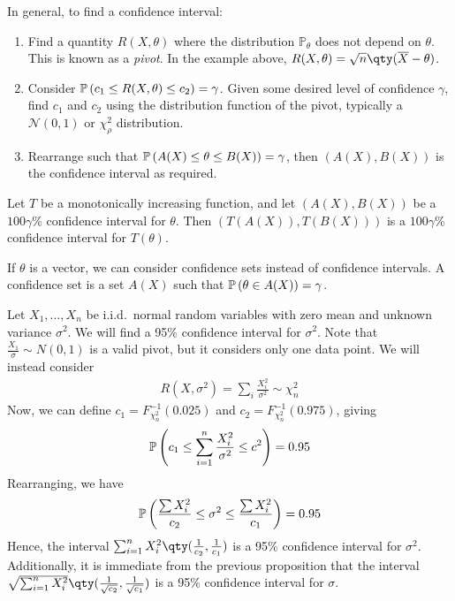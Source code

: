 \begin{remark}
	In general, to find a confidence interval:
	\begin{enumerate}
		\item Find a quantity $R(X,\theta)$ where the distribution $\mathbb P_\theta$ does not depend on $\theta$.
		      This is known as a \textit{pivot}.
		      In the example above, $R(X,\theta) = \sqrt{n}\qty(\overline X - \theta)$.
		\item Consider $\mathbb{P}\left({c_1 \leq R(X,\theta) \leq c_2}\right) = \gamma$.
		      Given some desired level of confidence $\gamma$, find $c_1$ and $c_2$ using the distribution function of the pivot, typically a $\mathcal{N}(0,1)$ or $\chi^2_\rho$ distribution.
		\item Rearrange such that $\mathbb{P}\left({A(X) \leq \theta \leq B(X)}\right) = \gamma$, then $(A(X), B(X))$ is the confidence interval as required.
	\end{enumerate}
\end{remark}

\begin{proposition}
	Let $T$ be a monotonically increasing function, and let $(A(X), B(X))$ be a $100 \gamma$\% confidence interval for $\theta$.
	Then $(T(A(X)), T(B(X)))$ is a $100 \gamma$\% confidence interval for $T(\theta)$.
\end{proposition}

\begin{remark}
	If $\theta$ is a vector, we can consider confidence sets instead of confidence intervals.
	A confidence set is a set $A(X)$ such that $\mathbb{P}\left({\theta \in A(X)}\right) = \gamma$.
\end{remark}

\begin{example}
	Let $X_1, \dots, X_n$ be i.i.d.\ normal random variables with zero mean and unknown variance $\sigma^2$.
	We will find a 95\% confidence interval for $\sigma^2$.
	Note that $\frac{X_1}{\sigma} \sim N(0,1)$ is a valid pivot, but it considers only one data point.
	We will instead consider
	\begin{align*}
		R(X, \sigma^2) = \sum_i \frac{X_i^2}{\sigma^2} \sim \chi^2_n
	\end{align*}
	Now, we can define $c_1 = F_{\chi^2_n}^{-1}(0.025)$ and $c_2 = F_{\chi^2_n}^{-1}(0.975)$, giving
	\begin{align*}
		\mathbb{P}\left({c_1 \leq \sum_{i=1}^n \frac{X_i^2}{\sigma^2} \leq c^2}\right) = 0.95
	\end{align*}
	Rearranging, we have
	\begin{align*}
		\mathbb{P}\left({\frac{\sum X_i^2}{c_2} \leq \sigma^2 \leq \frac{\sum X_i^2}{c_1}}\right) = 0.95
	\end{align*}
	Hence, the interval $\sum_{i=1}^n X_i^2 \qty(\frac{1}{c_2}, \frac{1}{c_1})$ is a 95\% confidence interval for $\sigma^2$.
	Additionally, it is immediate from the previous proposition that the interval $\sqrt{\sum_{i=1}^n X_i^2} \qty(\frac{1}{\sqrt{c_2}}, \frac{1}{\sqrt{c_1}})$ is a 95\% confidence interval for $\sigma$.
\end{example}

